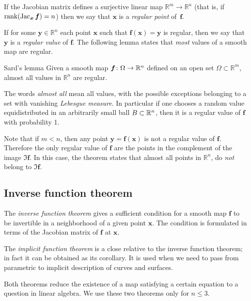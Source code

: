 If the Jacobian matrix defines a surjective linear map $\mathbb{R}^m\to\mathbb{R}^n$ (that is, if $\mathop{\rm rank}\nolimits(\mathop{\rm Jac}\nolimits_{\bm{x}}\bm{f})=n$) then we say that 
$\bm{x}$ is a \emph{regular point} of~$\bm{f}$.

If for some $\bm{y}\in \mathbb{R}^n$ each point $\bm{x}$ such that $\bm{f}(\bm{x})=\bm{y}$ is regular,
then we say that $\bm{y}$ is a \emph{regular value} of $\bm{f}$.
The following lemma states that {}\emph{most} values of a smooth map are regular.

\begin{thm}{Sard's lemma}\label{lem:sard}
Given a smooth map $\bm{f}\colon \Omega \z\to \mathbb{R}^n$ defined on an open set $\Omega\subset \mathbb{R}^m$, almost all values in $\mathbb{R}^n$ are regular.
\end{thm}

The words \emph{almost all} mean all values, with the possible exceptions belonging to a set with vanishing {}\emph{Lebesgue measure}.
In particular if one chooses a random value equidistributed in an arbitrarily small ball $B\z\subset \mathbb{R}^n$, then it is a regular value of $\bm{f}$ with probability 1.

Note that if $m<n$, then any point $\bm{y}=\bm{f}(\bm{x})$ is not a regular value of $\bm{f}$.
Therefore the only regular value of $\bm{f}$ are the points in the complement of the image $\Im \bm{f}$.
In this case, the theorem states that almost all points in $\mathbb{R}^n$, do {}\emph{not} belong to $\Im \bm{f}$.


\subsection*{Inverse function theorem}

The \emph{inverse function theorem} gives a sufficient condition for a smooth map $\bm{f}$ to be invertible in a neighborhood of a given point $\bm{x}$.
The condition is formulated in terms of the Jacobian matrix of $\bm{f}$ at $\bm{x}$.

The \emph{implicit function theorem} is a close relative to the inverse function theorem;
in fact it can be obtained as its corollary.
It is used when we need to pass from parametric to implicit description of curves and surfaces.

Both theorems reduce the existence of a map satisfying a certain equation to a question in linear algebra.
We use these two theorems only for $n\le 3$.

